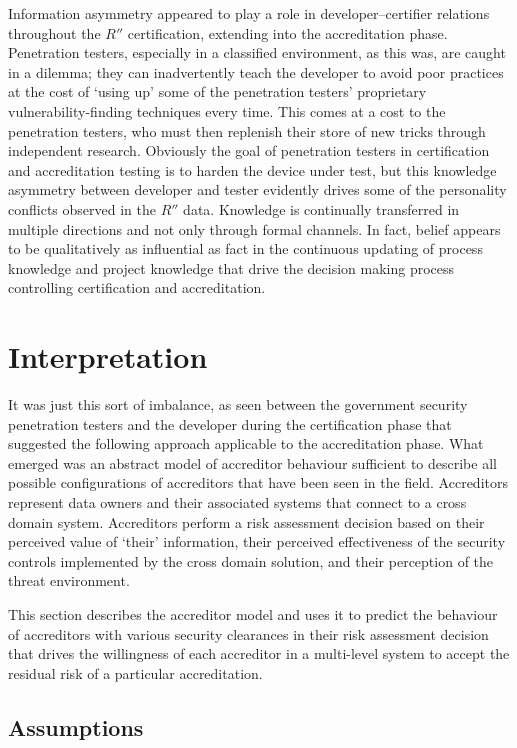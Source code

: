 \documentclass[10pt,letterpaper,conference]{IEEEtran}
\begin{document}
Information asymmetry appeared to play a role in developer--certifier relations throughout the
$R''$ certification, extending into the accreditation phase. Penetration testers, especially in a
classified environment, as this was, are caught in a dilemma; they can inadvertently teach the
developer to avoid poor practices at the cost of `using up' some of the penetration testers'
proprietary vulnerability-finding techniques every time. This comes at a cost to the penetration
testers, who must then replenish their store of new tricks through independent research. Obviously
the goal of penetration testers in certification and accreditation testing is to harden the device
under test, but this knowledge asymmetry between developer and tester evidently drives some of the
personality conflicts observed in the $R''$ data. Knowledge is continually transferred in multiple
directions and not only through formal channels. In fact, belief appears to be qualitatively as
influential as fact in the continuous updating of process knowledge and project knowledge that
drive the decision making process controlling certification and accreditation.

\section{Interpretation}

It was just this sort of imbalance, as seen between the government security penetration testers
and the developer during the certification phase that suggested the following approach
applicable to the accreditation phase. What emerged was an abstract model of accreditor behaviour
sufficient to describe all possible configurations of accreditors that have been seen in the field.
Accreditors represent data owners and their associated systems that connect to a cross domain
system. Accreditors perform a risk assessment decision based on their perceived value of `their'
information, their perceived effectiveness of the security controls implemented by the cross domain
solution, and their perception of the threat environment.

This section describes the accreditor model and uses it to predict the behaviour of accreditors
with various security clearances in their risk assessment decision that drives the willingness of
each accreditor in a multi-level system to accept the residual risk of a particular accreditation.

\subsection{Assumptions}
\end{document}
